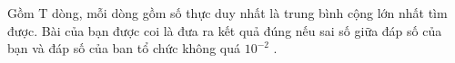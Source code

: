 Gồm T dòng, mỗi dòng gồm số thực duy nhất là trung bình cộng lớn nhất tìm được. Bài của bạn được coi là đưa ra kết quả đúng nếu sai số giữa đáp số của bạn và đáp số của ban tổ chức không quá $10^{-2}$   .